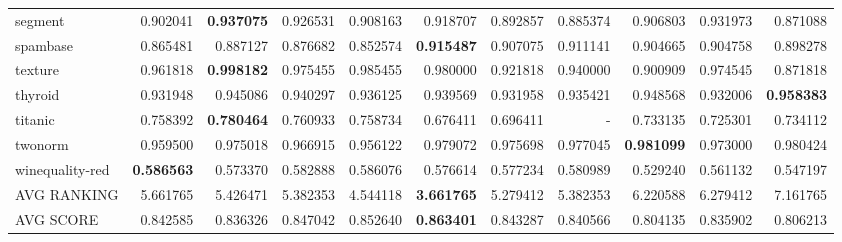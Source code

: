 \begin{tabular}{lrrrrrrrrrr}
segment         &   0.902041 &  \textbf{0.937075} &  0.926531 &  0.908163 &  0.918707 &  0.892857 &  0.885374 &  0.906803 &  0.931973 &  0.871088 \\
spambase        &   0.865481 &  0.887127 &  0.876682 &  0.852574 &  \textbf{0.915487} &  0.907075 &  0.911141 &  0.904665 &  0.904758 &  0.898278 \\
texture         &   0.961818 &  \textbf{0.998182} &  0.975455 &  0.985455 &  0.980000 &  0.921818 &  0.940000 &  0.900909 &  0.974545 &  0.871818 \\
thyroid         &   0.931948 &  0.945086 &  0.940297 &  0.936125 &  0.939569 &  0.931958 &  0.935421 &  0.948568 &  0.932006 &  \textbf{0.958383} \\
titanic         &   0.758392 &  \textbf{0.780464} &  0.760933 &  0.758734 &  0.676411 &  0.696411 &      - &  0.733135 &  0.725301 &  0.734112 \\
twonorm         &   0.959500 &  0.975018 &  0.966915 &  0.956122 &  0.979072 &  0.975698 &  0.977045 &  \textbf{0.981099} &  0.973000 &  0.980424 \\
winequality-red &   \textbf{0.586563} &  0.573370 &  0.582888 &  0.586076 &  0.576614 &  0.577234 &  0.580989 &  0.529240 &  0.561132 &  0.547197 \\
\bottomrule
AVG RANKING & 5.661765 & 5.426471 & 5.382353 & 4.544118 & \textbf{3.661765} & 5.279412 & 5.382353 & 6.220588 & 6.279412 & 7.161765 \\
AVG SCORE & 0.842585 & 0.836326 & 0.847042 & 0.852640 & \textbf{0.863401} & 0.843287 & 0.840566 & 0.804135 & 0.835902 & 0.806213 \\
\end{tabular}
